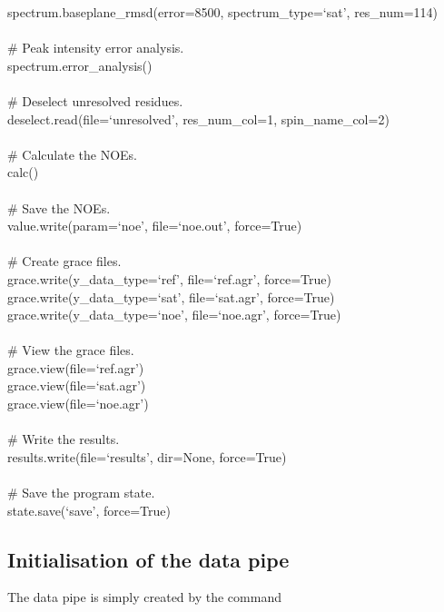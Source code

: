 \begin{exampleenv}
spectrum.baseplane\_rmsd(error=8500, spectrum\_type=`sat', res\_num=114) \\
 \\
\# Peak intensity error analysis. \\
spectrum.error\_analysis() \\
 \\
\# Deselect unresolved residues. \\
deselect.read(file=`unresolved', res\_num\_col=1, spin\_name\_col=2) \\
 \\
\# Calculate the NOEs. \\
calc() \\
 \\
\# Save the NOEs. \\
value.write(param=`noe', file=`noe.out', force=True) \\
 \\
\# Create grace files. \\
grace.write(y\_data\_type=`ref', file=`ref.agr', force=True) \\
grace.write(y\_data\_type=`sat', file=`sat.agr', force=True) \\
grace.write(y\_data\_type=`noe', file=`noe.agr', force=True) \\
 \\
\# View the grace files. \\
grace.view(file=`ref.agr') \\
grace.view(file=`sat.agr') \\
grace.view(file=`noe.agr') \\
 \\
\# Write the results. \\
results.write(file=`results', dir=None, force=True) \\
 \\
\# Save the program state. \\
state.save(`save', force=True)
\end{exampleenv}




\subsection{Initialisation of the data pipe} \label{NOE initialisation}

The data pipe is simply created by the command

